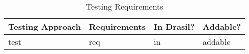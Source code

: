 \begin{table}[hbtp!]
    \centering
    \caption{Testing Requirements}
    \label{tab:testReqs}
    \begin{tabularx}{\textwidth}{|l|X|l|l|}
        \hline
        \rowcolor{McMasterMediumGrey}
        \textbf{Testing Approach} & \textbf{Requirements} & \textbf{In Drasil?} & \textbf{Addable?} \\
        \hline
        test                      & req                   & in                  & addable           \\
        \hline
    \end{tabularx}
\end{table}